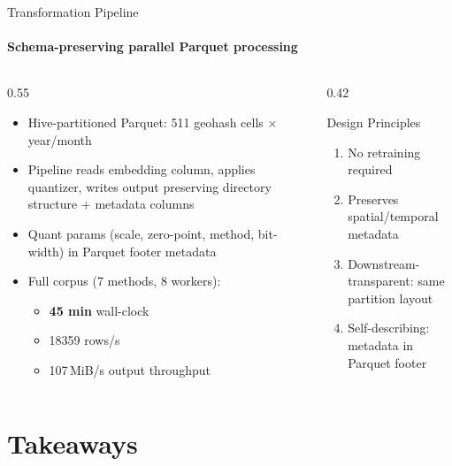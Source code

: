 \documentclass[aspectratio=169,10pt]{beamer}
\begin{document}
\begin{frame}{Transformation Pipeline}
	\framesubtitle{Schema-preserving parallel Parquet processing}
	\begin{columns}[T]
		\begin{column}{0.55\textwidth}
			\begin{itemize}
				\item Hive-partitioned Parquet: 511 geohash cells $\times$ year/month
				\item Pipeline reads embedding column, applies quantizer, writes output
				      preserving directory structure + metadata columns
				\item Quant params (scale, zero-point, method, bit-width) in
				      Parquet footer metadata
				\item Full corpus (7 methods, 8 workers):
				      \begin{itemize}
					      \item \textbf{45 min} wall-clock
					      \item \num{18359} rows/s
					      \item 107\,MiB/s output throughput
				      \end{itemize}
			\end{itemize}
		\end{column}
		\begin{column}{0.42\textwidth}
			\begin{block}{Design Principles}
				\begin{enumerate}
					\item No retraining required
					\item Preserves spatial/temporal metadata
					\item Downstream-transparent: same partition layout
					\item Self-describing: metadata in Parquet footer
				\end{enumerate}
			\end{block}
		\end{column}
	\end{columns}
\end{frame}

\section{Takeaways}
\end{document}
